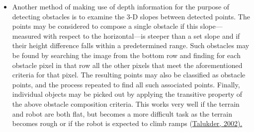 \documentclass[12pt]{report}
\begin{document}
\begin{itemize}
\item{Another method of making use of depth information for the purpose of detecting obstacles is to examine the 3-D slopes between detected points.  The points may be considered to compose a single obstacle if this slope---measured with respect to the horizontal---is steeper than a set slope and if their height difference falls within a predetermined range.  Such obstacles may be found by searching the image from the bottom row and finding for each obstacle pixel in that row all the other pixels that meet the aforementioned criteria for that pixel.  The resulting points may also be classified as obstacle points, and the process repeated to find all such associated points.  Finally, individual objects may be picked out by applying the transitive property of the above obstacle composition criteria.  This works very well if the terrain and robot are both flat, but becomes a more difficult task as the terrain becomes rough or if the robot is expected to climb ramps (\hyperref[bib:talukder]{Talukder, 2002).}}
\end{itemize}
\end{document}
